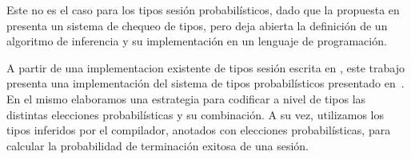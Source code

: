 Este no es el caso para los tipos sesión probabilísticos, dado que la
propuesta en~\cite{DBLP:conf/concur/InversoMPTT20} presenta un sistema de
chequeo de tipos, pero deja abierta la definición de un algoritmo de inferencia
y su implementación en un lenguaje de programación.

A partir de una implementacion existente de tipos sesión escrita en \OCaml,
este trabajo presenta una implementación del sistema de tipos probabilísticos
presentado en~\cite{DBLP:conf/concur/InversoMPTT20}. En el mismo elaboramos una
estrategia para codificar a nivel de tipos las distintas elecciones
probabilísticas y su combinación. A su vez, utilizamos los tipos inferidos por
el compilador, anotados con elecciones probabilísticas, para calcular la
probabilidad de terminación exitosa de una sesión.
